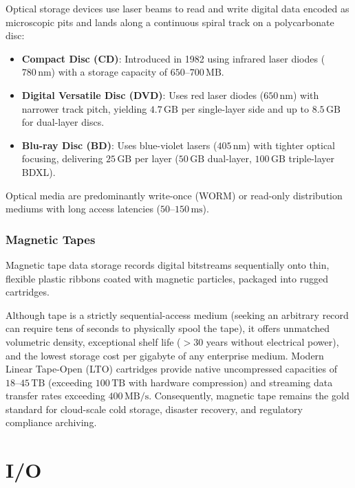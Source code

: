 Optical storage devices use laser beams to read and write digital data encoded as microscopic pits and lands along a continuous spiral track on a polycarbonate disc:
\begin{itemize}
    \item \textbf{Compact Disc (CD)}: Introduced in 1982 using infrared laser diodes ($780\,\text{nm}$) with a storage capacity of $650\text{--}700\,\text{MB}$.
    \item \textbf{Digital Versatile Disc (DVD)}: Uses red laser diodes ($650\,\text{nm}$) with narrower track pitch, yielding $4.7\,\text{GB}$ per single-layer side and up to $8.5\,\text{GB}$ for dual-layer discs.
    \item \textbf{Blu-ray Disc (BD)}: Uses blue-violet lasers ($405\,\text{nm}$) with tighter optical focusing, delivering $25\,\text{GB}$ per layer ($50\,\text{GB}$ dual-layer, $100\,\text{GB}$ triple-layer BDXL).
\end{itemize}
Optical media are predominantly write-once (WORM) or read-only distribution mediums with long access latencies ($50\text{--}150\,\text{ms}$).

\subsubsection{Magnetic Tapes}

Magnetic tape data storage records digital bitstreams sequentially onto thin, flexible plastic ribbons coated with magnetic particles, packaged into rugged cartridges. 

Although tape is a strictly sequential-access medium (seeking an arbitrary record can require tens of seconds to physically spool the tape), it offers unmatched volumetric density, exceptional shelf life ($> 30$ years without electrical power), and the lowest storage cost per gigabyte of any enterprise medium. Modern Linear Tape-Open (LTO) cartridges provide native uncompressed capacities of $18\text{--}45\,\text{TB}$ (exceeding $100\,\text{TB}$ with hardware compression) and streaming data transfer rates exceeding $400\,\text{MB/s}$. Consequently, magnetic tape remains the gold standard for cloud-scale cold storage, disaster recovery, and regulatory compliance archiving.




\section{I/O}

